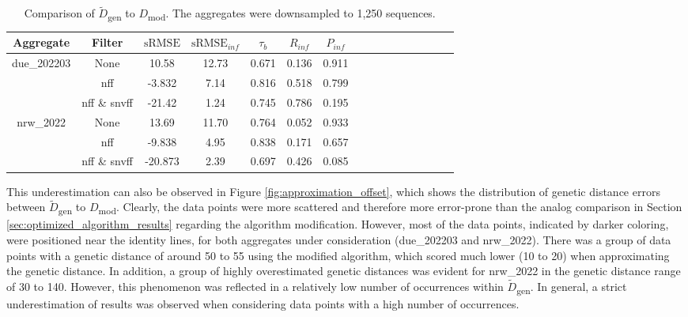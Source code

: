 \begin{table}[H]    
        \caption[Comparison of $\tilde{D}$\textsubscript{gen} to $D$\textsubscript{mod}]{Comparison of $\tilde{D}$\textsubscript{gen} to $D$\textsubscript{mod}. The aggregates were downsampled to 1,250 sequences.}
        \centering
        \begin{threeparttable}
        \begin{tabular}{ Sc | Sc | Sc Sc Sc Sc Sc Sc } 
        Aggregate & Filter & $\text{sRMSE}$ & $\text{sRMSE}_{inf}$ & $\tau_b$ & $R_{inf}$ & $P_{inf}$\\
        \hline\hline
        due\_202203&None&10.58&12.73&0.671&0.136&0.911\\
        &\acrshort{nff}&-3.832&7.14&0.816&0.518&0.799\\
        &\acrshort{nff} \& \acrshort{snvff}&-21.42&1.24&0.745&0.786&0.195\\
        \hline
        nrw\_2022&None&13.69&11.70&0.764&0.052&0.933\\
        &\acrshort{nff}&-9.838&4.95&0.838&0.171&0.657\\
        &\acrshort{nff} \& \acrshort{snvff}&-20.873&2.39&0.697&0.426&0.085\\
        \end{tabular}
        \end{threeparttable}
        \label{table:approximation_matrix_evaluation_for_aggregates}
\end{table}

This underestimation can also be observed in Figure \ref{fig:approximation_offset}, which shows the distribution of genetic distance errors between $\tilde{D}$\textsubscript{gen} to $D$\textsubscript{mod}. Clearly, the data points were more scattered and therefore more error-prone than the analog comparison in Section \ref{sec:optimized_algorithm_results} regarding the algorithm modification. However, most of the data points, indicated by darker coloring, were positioned near the identity lines, for both aggregates under consideration (due\_202203 and nrw\_2022). There was a group of data points with a genetic distance of around 50 to 55 using the modified algorithm, which scored much lower (10 to 20) when approximating the genetic distance. In addition, a group of highly overestimated genetic distances was evident for nrw\_2022 in the genetic distance range of 30 to 140. However, this phenomenon was reflected in a relatively low number of occurrences within $\tilde{D}$\textsubscript{gen}. In general, a strict underestimation of results was observed when considering data points with a high number of occurrences.

